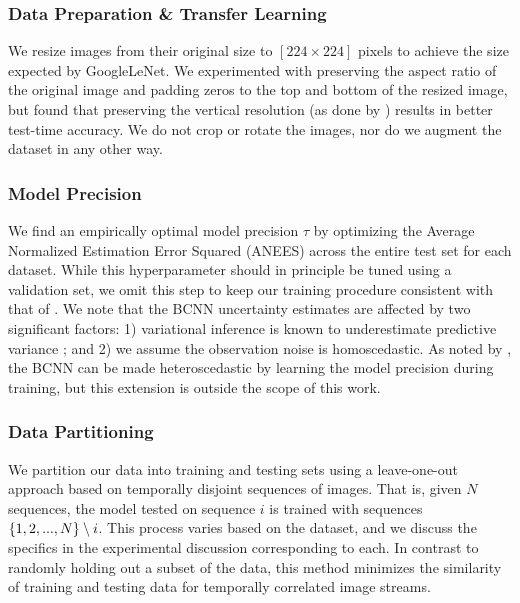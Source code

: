 \subsubsection{Data Preparation \& Transfer Learning}
We resize images from their original size to $[224 \times 224]$ pixels to achieve the size expected by GoogleLeNet. 
We experimented with preserving the aspect ratio of the original image and padding zeros to the top and bottom of the resized image, but found that preserving the vertical resolution (as done by \citet{Ma2016-at}) results in better test-time accuracy. We do not crop or rotate the images, nor do we augment the dataset in any other way.

\subsubsection{Model Precision}
We find an empirically optimal model precision $\tau$ by optimizing the Average Normalized Estimation Error Squared (ANEES) across the entire test set for each dataset. 
While this hyperparameter should in principle be tuned using a validation set, we omit this step to keep our training procedure consistent with that of \citet{Ma2016-at}. 
We note that the BCNN uncertainty estimates are affected by two significant factors: 1) variational inference is known to underestimate predictive variance  \citep{Gal2016UncertaintyThesis}; and 2) we assume the observation noise is homoscedastic. 
As noted by \citet{Gal2016UncertaintyThesis}, the BCNN can be made heteroscedastic by learning the model precision during training, but this extension is outside the scope of this work.

\subsubsection{Data Partitioning}
    We partition our data into training and testing sets using a leave-one-out approach based on temporally disjoint sequences of images. That is, given $N$ sequences, the model tested on sequence $i$ is trained with sequences $\left\{1,2,..., N\right\} \setminus i$. This process varies based on the dataset, and we discuss the specifics in the experimental discussion corresponding to each. In contrast to  randomly holding out a subset of the data, this method minimizes the similarity of training and testing data for temporally correlated image streams.

